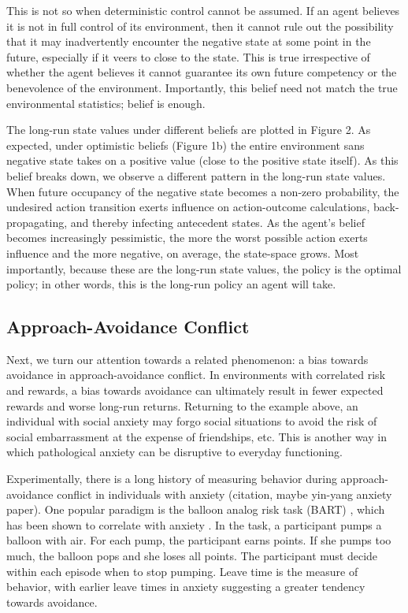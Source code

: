 \documentclass[11pt]{article} %
\begin{document}
This is not so when deterministic control cannot be assumed. If an agent believes
it is not in full control of its environment, then it cannot rule out the possibility
that it may inadvertently encounter the negative state at some point in the future,
especially if it veers to close to the state. This is true irrespective of whether
the agent believes it cannot guarantee its own future competency or the benevolence
of the environment. Importantly, this belief need not match the true environmental
statistics; belief is enough.

The long-run state values under different beliefs are plotted in Figure 2. As
expected, under optimistic beliefs (Figure 1b) the entire environment sans negative
state takes on a positive value (close to the positive state itself). As this belief
breaks down, we observe a different pattern in the long-run state values. When
future occupancy of the negative state becomes a non-zero probability, the undesired
action transition exerts influence on action-outcome calculations, back-propagating,
and thereby infecting antecedent states. As the agent's belief becomes increasingly
pessimistic, the more the worst possible action exerts influence and the more
negative, on average, the state-space grows. Most importantly, because these are
the long-run state values, the policy is the optimal policy; in other words, this
is the long-run policy an agent will take.

\subsection{Approach-Avoidance Conflict}

Next, we turn our attention towards a related phenomenon: a bias towards avoidance
in approach-avoidance conflict. In environments with correlated risk and rewards,
a bias towards avoidance can ultimately result in fewer expected rewards and worse
long-run returns. Returning to the example above, an individual with social anxiety
may forgo social situations to avoid the risk of social embarrassment at the expense
of friendships, etc. This is another way in which pathological anxiety can be
disruptive to everyday functioning.

Experimentally, there is a long history of measuring behavior during
approach-avoidance conflict in individuals with anxiety (citation, maybe yin-yang anxiety paper).
One popular paradigm is the balloon analog risk task (BART) \citep{Lejuez2002},
which has been shown to correlate with anxiety \cite{Maner2007, Giorgetta2012}.
In the task, a participant pumps a balloon with air. For each pump, the participant
earns points. If she pumps too much, the balloon pops and she loses all points.
The participant must decide within each episode when to stop pumping. Leave time
is the measure of behavior, with earlier leave times in anxiety suggesting a
greater tendency towards avoidance.
\end{document}
